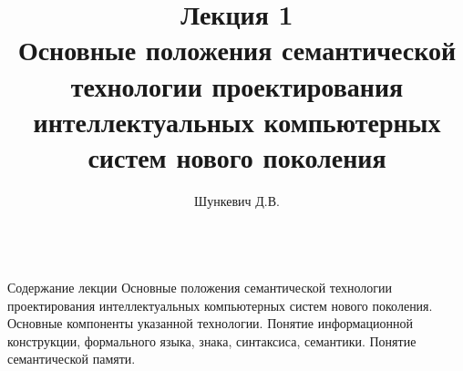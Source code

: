 \title{Лекция 1\\Основные положения семантической технологии проектирования интеллектуальных компьютерных систем нового поколения \vspace{-2em}}   
\author[]{Шункевич Д.В.}

\begin{frame}
	\titlepage
\end{frame}

\begin{frame}{\\Содержание лекции}
	\topline
	\justifying
	Основные положения семантической технологии проектирования интеллектуальных компьютерных систем нового поколения. Основные компоненты указанной технологии. Понятие информационной конструкции, формального языка, знака, синтаксиса, семантики. Понятие семантической памяти.
\end{frame}